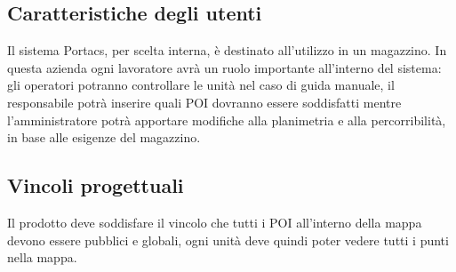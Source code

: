 \subsection{Caratteristiche degli utenti}
Il sistema Portacs, per scelta interna, è destinato all'utilizzo in un magazzino. In questa azienda ogni lavoratore avrà un ruolo importante all'interno del sistema: gli operatori potranno controllare le unità nel caso di guida manuale, il responsabile potrà inserire quali POI dovranno essere soddisfatti mentre l'amministratore potrà apportare modifiche alla planimetria e alla percorribilità, in base alle esigenze del magazzino.
\subsection{Vincoli progettuali}
Il prodotto deve soddisfare il vincolo che tutti i POI all'interno della mappa devono essere pubblici e globali, ogni unità deve quindi poter vedere tutti i punti nella mappa.
